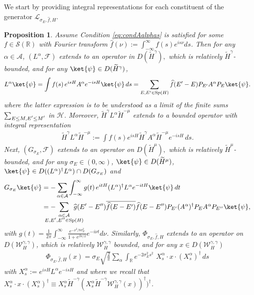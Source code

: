 \documentclass[11pt]{amsart}
\newcommand{\1}{\mathbbm{1}}
\newcommand{\E}{\mathbb{E}}
\theoremstyle{plain}
\newtheorem{proposition}[theorem]{Proposition}
\theoremstyle{definition}
\theoremstyle{remark}
\numberwithin{equation}{section}
\begin{document}
We start by providing integral representations for each constituent of the generator $\mathcal{L}_{\sigma_E,\widehat{f},H}$.



\begin{proposition}\label{integralrep}
Assume Condition \ref{eq:condAalphas} is satisfied for some $f\in\mathcal{S}(\mathbb{R})$ with Fourier transform $\widehat{f}(\nu):=\int_{-\infty}^\infty f(s)e^{is\nu}ds$. Then for any $\alpha\in\mathcal{A}$, $(L^\alpha,\mathcal{F})$ extends to an operator in $D(\widetilde{H}^{\gamma}),$ which is relatively $\widetilde H^\gamma$-bounded, and for any $\ket{\psi}\in D(\widetilde{H}^{\gamma})$, 
\begin{align*}
L^\alpha\ket{\psi}=\int f(s)\,e^{isH}A^\alpha e^{-isH}\ket{\psi}\,ds=\sum_{E,E'\in\operatorname{Sp}(H)}\widehat{f}(E'-E)P_{E'}A^\alpha P_{E}\ket{\psi}.
\end{align*}
where the latter expression is to be understood as a limit of the finite sums $\sum_{\smash{E\le M,E'\le M'}}$ in $\mathcal{H}$. Moreover, $\widetilde{H}^{\gamma }L^\alpha \widetilde{H}^{-\mu}$ extends to a bounded operator with integral representation
\begin{align*}
\widetilde{H}^{\gamma }L^\alpha \widetilde{H}^{-\mu}:=\int f(s) e^{isH}\widetilde{H}^{\gamma } A^\alpha \widetilde{H}^{-\mu}e^{-isH}\,ds.
\end{align*}
Next, $(G_{\sigma_E},\mathcal{F})$ extends to an operator on $D(\widetilde{H}^{\mu}),$ which is relatively $\widetilde H^\mu$-bounded, and for any {$\sigma_E\in(0,\infty)$,} $\ket{\psi}\in D(\widetilde{H}^{\mu})$, $\ket{\psi}\in D((L^\alpha)^\dagger L^\alpha )\cap D(G_{\sigma_E})$ and
\begin{align*}
G_{\sigma_E}\ket{\psi}&=-\sum_{\alpha\in\mathcal{A}}\int_{-\infty}^\infty g(t)\,e^{itH}(L^\alpha)^\dagger L^\alpha e^{-itH}\ket{\psi}\,dt\\
&=-\!\!\!\!\!\!\!\!\!\!\!\sum_{\substack{\alpha\in\mathcal{A}\\E,E',E''\in\operatorname{Sp}(H)}}\!\!\!\!\!\!\!\!\!\!\widehat g(E'-E'')\overline{\widehat{f}(E-E')}\widehat{f}(E-E'')P_{E'}(A^\alpha)^\dagger P_{E}A^\alpha P_{E''}\ket{\psi},
\end{align*}
with $g(t)=\frac{1}{2\pi}\int_{-\infty}^\infty \frac{e^{-\nu^2/8\sigma_E^2}}{1+e^{\beta\nu/2}} e^{-i\nu t}d\nu$. Similarly, $\Phi_{\sigma_E,\widehat{f},H}$ extends to an operator on $D(\mathcal{W}_H^{\gamma,\gamma})$, which is relatively $\mathcal{W}^{\gamma,\gamma}_H$ bounded, and for any $x\in D(\mathcal{W}_H^{\gamma,\gamma})$ 
\begin{align}
\Phi_{\sigma_E,\widehat{f},H}(x)=\sigma_E\sqrt{\frac{2}{\pi}}\sum_{\alpha}\int_{\mathbb{R}}e^{-2\sigma_E^2 s^2}\, \, X^{\alpha}_s \cdot x\cdot  (X_s^\alpha)^\dagger \,ds
\end{align}
with $X^{\alpha}_s:=e^{isH}L^\alpha e^{-isH}$ and where we recall that $X_s^\alpha\cdot x\cdot (X_s^\alpha)^\dagger \equiv X_s^\alpha\widetilde{H}^{-\gamma}(X^\alpha_s\widetilde{H}^{-\gamma}\mathcal{W}_H^{\gamma,\gamma}(x))^\dagger)^\dagger$.
\end{proposition}
\end{document}
